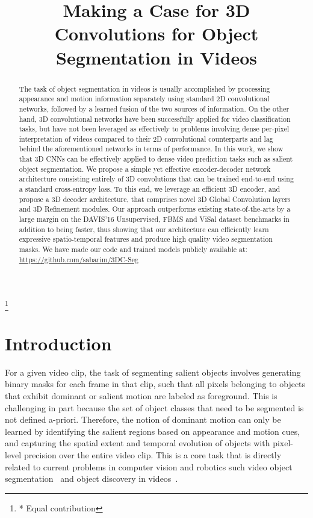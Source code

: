 \documentclass{bmvc2k}
\title{Making a Case for 3D Convolutions for Object Segmentation in Videos}
\newcommand\blfootnote[1]{\begingroup
  \renewcommand\thefootnote{}\footnote{#1}\addtocounter{footnote}{-1}\endgroup
}
\begin{document}
\maketitle

\blfootnote{* Equal contribution}

\begin{abstract}
The task of object segmentation in videos is usually accomplished by processing appearance and motion information separately using standard 2D convolutional networks, followed by a learned fusion of the two sources of information.
On the other hand, 3D convolutional networks have been successfully applied for video classification tasks, but have not been leveraged as effectively to problems involving dense per-pixel interpretation of videos compared to their 2D convolutional counterparts and lag behind the aforementioned networks in terms of performance.
In this work, we show that 3D CNNs can be effectively applied to dense video prediction tasks such as salient object segmentation. We propose a simple yet effective encoder-decoder network architecture consisting entirely of 3D convolutions that can be trained end-to-end using a standard cross-entropy loss.
    To this end, we leverage an efficient 3D encoder, and propose a 3D decoder architecture, that comprises novel 3D Global Convolution layers and 3D Refinement modules. Our approach outperforms existing state-of-the-arts by a large margin on the DAVIS'16 Unsupervised, FBMS and ViSal dataset benchmarks in addition to being faster, thus showing that our architecture can efficiently learn expressive spatio-temporal features and produce high quality video segmentation masks.
We have made our code and trained models publicly available at: \url{https://github.com/sabarim/3DC-Seg}
\end{abstract}

\section{Introduction}
\label{sec:intro}

For a given video clip, the task of segmenting salient objects involves generating binary masks for each frame in that clip, such that all pixels belonging to objects that exhibit dominant or salient motion are labeled as foreground. 
This is challenging in part because the set of object classes that need to be segmented is not defined a-priori. Therefore, the notion of dominant motion can only be learned by identifying the salient regions based on appearance and motion cues, and capturing the spatial extent and temporal evolution of objects with pixel-level precision over the entire video clip.
This is a core task that is directly related to current problems in computer vision and robotics such video object segmentation~\cite{Perazzi16CVPR,PontTuset17arxiv} and object discovery in videos~\cite{Xiao16CVPR, Osep19ICRA, Wang14ECCV, Kwak15ICCV}.
\end{document}
